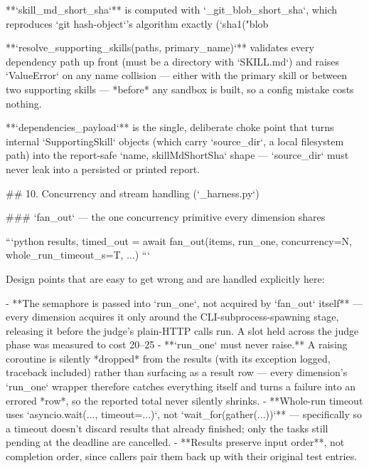 **`skill_md_short_sha`** is computed with `_git_blob_short_sha`, which reproduces `git hash-object`'s algorithm exactly (`sha1("blob %

**`resolve_supporting_skills(paths, primary_name)`** validates every dependency path up front (must be a directory with `SKILL.md`) and raises `ValueError` on any name collision — either with the primary skill or between two supporting skills — *before* any sandbox is built, so a config mistake costs nothing.

**`dependencies_payload`** is the single, deliberate choke point that turns internal `SupportingSkill` objects (which carry `source_dir`, a local filesystem path) into the report-safe `{name, skillMdShortSha}` shape — `source_dir` must never leak into a persisted or printed report.

## 10. Concurrency and stream handling (`_harness.py`)

### `fan_out` — the one concurrency primitive every dimension shares

```python
results, timed_out = await fan_out(items, run_one, concurrency=N, whole_run_timeout_s=T, ...)
```

Design points that are easy to get wrong and are handled explicitly here:

- **The semaphore is passed into `run_one`, not acquired by `fan_out` itself** — every dimension acquires it only around the CLI-subprocess-spawning stage, releasing it before the judge's plain-HTTP calls run. A slot held across the judge phase was measured to cost 20–25%
- **`run_one` must never raise.** A raising coroutine is silently *dropped* from the results (with its exception logged, traceback included) rather than surfacing as a result row — every dimension's `run_one` wrapper therefore catches everything itself and turns a failure into an errored *row*, so the reported total never silently shrinks.
- **Whole-run timeout uses `asyncio.wait(..., timeout=...)`, not `wait_for(gather(...))`** — specifically so a timeout doesn't discard results that already finished; only the tasks still pending at the deadline are cancelled.
- **Results preserve input order**, not completion order, since callers pair them back up with their original test entries.


